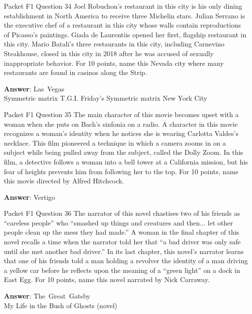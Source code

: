 \begin{frame}{Packet F1 Question 34}
Joel   Robuchon’s restaurant in this city is his only dining establishment   in North America to receive three Michelin stars. Julian Serrano is the executive chef of a restaurant in this city whose walls contain reproductions of Picasso’s paintings. Giada de Laurentiis opened her first, flagship restaurant in this city. Mario Batali’s three restaurants in this city, including Carnevino Steakhouse, closed in this city in 2018 after he was accused of sexually inappropriate behavior. For 10 points, name this Nevada city where   many restaurants are found in casinos along the Strip.      

\textbf{Answer}: Las\ Vegas\\
 Symmetric matrix
 T.G.I. Friday's
 Symmetric matrix
 New York City
\end{frame}

\begin{frame}{Packet F1 Question 35}
The main character of this movie becomes upset with a woman when she puts on Bach’s sinfonia on a radio. A character in this movie recognizes a woman’s identity when he notices she is wearing Carlotta Valdes’s necklace. This film pioneered a technique in which a camera zooms in on   a subject while being pulled away from the subject, called the Dolly Zoom. In this   film, a detective follows a woman into a bell tower at a   California mission, but his fear of heights prevents him from   following her to the top. For 10 points, name this movie directed by Alfred Hitchcock.

\textbf{Answer}: Vertigo\\
\end{frame}

\begin{frame}{Packet F1 Question 36}
The narrator of this novel chastises two of his friends as “careless people” who “smashed up things and creatures and then... let other people clean up the mess they had made.” A woman in the final chapter of this novel recalls a time when the narrator told her that “a bad driver was only safe until she met another bad driver.” In its last chapter, this novel’s narrator learns that one of his friends told a man holding a revolver the identity of a man driving a yellow car before he reflects upon the meaning of a “green light” on a dock     in East Egg. For 10 points, name this novel   narrated by Nick Carraway.    

\textbf{Answer}: The\ Great\ Gatsby\\
 My Life in the Bush of Ghosts (novel)
\end{frame}

